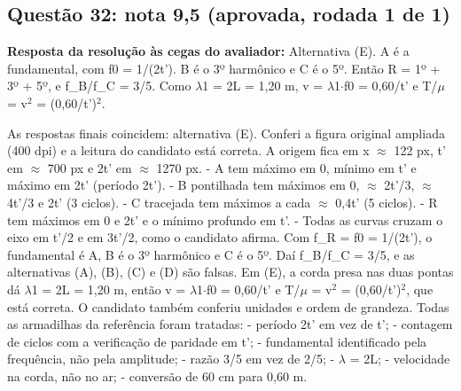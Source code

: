 \documentclass{article}%
\begin{document}
\subsection*{Questão 32: nota 9,5 (aprovada, rodada 1 de 1)}%
\textbf{Resposta da resolução às cegas do avaliador:} Alternativa (E). A é a fundamental, com f0 = 1/(2t'). B é o 3º harmônico e C é o 5º. Então R = 1º + 3º + 5º, e f\_B/f\_C = 3/5. Como $\lambda$1 = 2L = 1,20 m, v = $\lambda$1$\cdot$f0 = 0,60/t' e T/$\mu$ = v$^2$ = (0,60/t')$^2$.\par %
As respostas finais coincidem: alternativa (E). Conferi a figura original ampliada (400 dpi) e a leitura do candidato está correta. A origem fica em x $\approx$ 122 px, t' em $\approx$ 700 px e 2t' em $\approx$ 1270 px.\newline%
{-} A tem máximo em 0, mínimo em t' e máximo em 2t' (período 2t').\newline%
{-} B pontilhada tem máximos em 0, $\approx$ 2t'/3, $\approx$ 4t'/3 e 2t' (3 ciclos).\newline%
{-} C tracejada tem máximos a cada $\approx$ 0,4t' (5 ciclos).\newline%
{-} R tem máximos em 0 e 2t' e o mínimo profundo em t'.\newline%
{-} Todas as curvas cruzam o eixo em t'/2 e em 3t'/2, como o candidato afirma.\newline%
\newline%
Com f\_R = f0 = 1/(2t'), o fundamental é A, B é o 3º harmônico e C é o 5º. Daí f\_B/f\_C = 3/5, e as alternativas (A), (B), (C) e (D) são falsas. Em (E), a corda presa nas duas pontas dá $\lambda$1 = 2L = 1,20 m, então v = $\lambda$1$\cdot$f0 = 0,60/t' e T/$\mu$ = v$^2$ = (0,60/t')$^2$, que está correta. O candidato também conferiu unidades e ordem de grandeza.\newline%
\newline%
Todas as armadilhas da referência foram tratadas:\newline%
{-} período 2t' em vez de t';\newline%
{-} contagem de ciclos com a verificação de paridade em t';\newline%
{-} fundamental identificado pela frequência, não pela amplitude;\newline%
{-} razão 3/5 em vez de 2/5;\newline%
{-} $\lambda$ = 2L;\newline%
{-} velocidade na corda, não no ar;\newline%
{-} conversão de 60 cm para 0,60 m.\newline%
\end{document}
